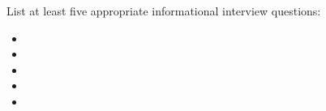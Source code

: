 

List at least five appropriate informational interview questions:

\begin{itemize}
\item{} 
\vskip 30pt
\item{} 
\vskip 30pt
\item{} 
\vskip 30pt
\item{} 
\vskip 30pt
\item{} 
\vskip 30pt
\medskip















\end{itemize}

